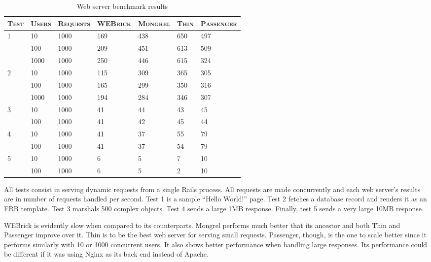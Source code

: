 \begin{table}[h!t]
  \centering
  
  \begin{tabular}{p{1.3cm}|p{1.8cm}|p{2cm}|p{2cm}|p{2cm}|p{1.3cm}|p{2cm}}
    \textsc{Test}
  & \textsc{Users}
  & \textsc{Requests}
  & \textsc{WEBrick}
  & \textsc{Mongrel}
  & \textsc{Thin}
  & \textsc{Passenger} \\
  \hline

  \multirow{3}{*}{1}
  & 10 & 1000 & 169 & 438 & 650 & 497\\
  & 100 & 1000 & 209 & 451 & 613 & 509\\
  & 1000 & 1000 & 250 & 446 & 615 & 324\\
  \hline
    
  \multirow{3}{*}{2}
  & 10 & 1000 & 115 & 309 & 365 & 305\\
  & 100 & 1000 & 165 & 299 & 350 & 316\\
  & 1000 & 1000 & 194 & 284 & 346 & 307\\
  \hline
  
  \multirow{2}{*}{3}
  & 10 & 1000 & 41 & 44 & 43 & 45\\
  & 100 & 1000 & 41 & 42 & 45 & 44\\
  \hline

  \multirow{2}{*}{4}
  & 10 & 1000 & 41 & 37 & 55 & 79\\
  & 100 & 1000 & 41 & 37 & 54 & 79\\
  \hline
  
  \multirow{2}{*}{5}
  & 10 & 1000 & 6 & 5 & 7 & 10\\
  & 100 & 1000 & 6 & 5 & 2 & 10\\
  
  \end{tabular}
  \caption{Web server benchmark results}
  \label{tab:webserver_benchmarks}
\end{table}
All tests consist in serving dynamic requests from a single Rails process. All requests are made concurrently and each web server's results are in number of requests handled per second. Test 1 is a sample ``Hello World!'' page. Test 2 fetches a database record and renders it as an ERB template. Test 3 marshals 500 complex objects. Test 4 sends a large 1MB response. Finally, test 5 sends a very large 10MB response.

WEBrick is evidently slow when compared to its counterparts. Mongrel performs much better that its ancestor and both Thin and Passenger improve over it. Thin is to be the best web server for serving small requests. Passenger, though, is the one to scale better since it performs similarly with 10 or 1000 concurrent users. It also shows better performance when handling large responses. Its performance could be different if it was using Nginx as its back end instead of Apache.  

